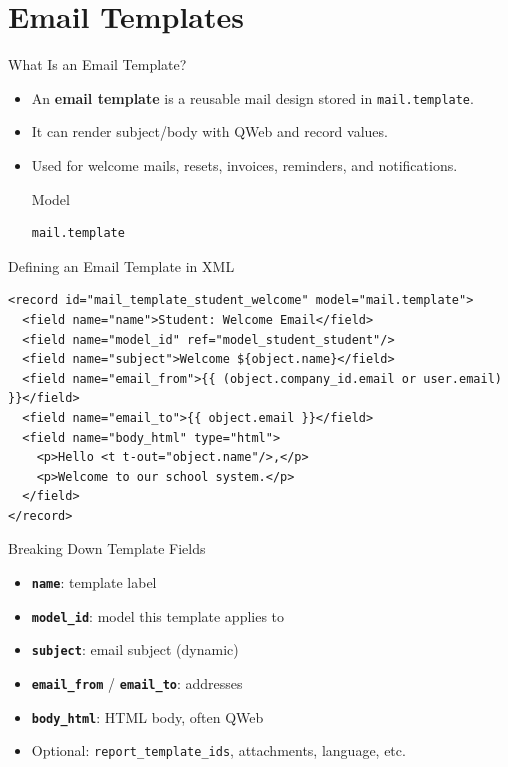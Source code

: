 \section{Email Templates}

\begin{frame}[fragile]{What Is an Email Template?}
	\begin{itemize}
		\item An \textbf{email template} is a reusable mail design stored in \texttt{mail.template}.
		\item It can render subject/body with QWeb and record values.
		\item Used for welcome mails, resets, invoices, reminders, and notifications.
\begin{block}{Model}
\begin{lstlisting}
mail.template
\end{lstlisting}
\end{block}
	\end{itemize}
\end{frame}

\begin{frame}[fragile]{Defining an Email Template in XML}
\begin{lstlisting}[style=xml]
<record id="mail_template_student_welcome" model="mail.template">
  <field name="name">Student: Welcome Email</field>
  <field name="model_id" ref="model_student_student"/>
  <field name="subject">Welcome ${object.name}</field>
  <field name="email_from">{{ (object.company_id.email or user.email) }}</field>
  <field name="email_to">{{ object.email }}</field>
  <field name="body_html" type="html">
	<p>Hello <t t-out="object.name"/>,</p>
	<p>Welcome to our school system.</p>
  </field>
</record>
\end{lstlisting}
\end{frame}

\begin{frame}[fragile]{Breaking Down Template Fields}
	\begin{itemize}
		\item \textbf{\texttt{name}}: template label
		\item \textbf{\texttt{model\_id}}: model this template applies to
		\item \textbf{\texttt{subject}}: email subject (dynamic)
		\item \textbf{\texttt{email\_from}} / \textbf{\texttt{email\_to}}: addresses
		\item \textbf{\texttt{body\_html}}: HTML body, often QWeb
		\item Optional: \texttt{report\_template\_ids}, attachments, language, etc.
	\end{itemize}
\end{frame}

